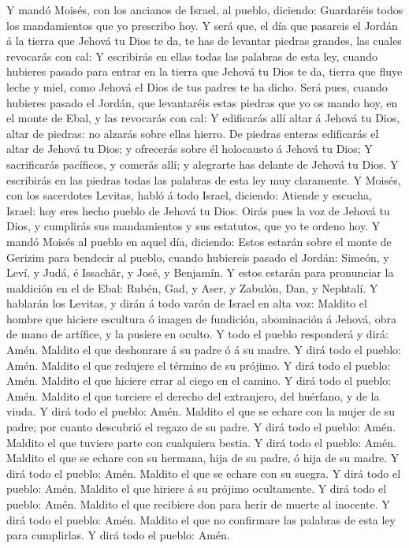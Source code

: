  Y mandó Moisés, con los ancianos de Israel, al pueblo,
diciendo: Guardaréis todos los mandamientos que yo prescribo hoy.
 Y será que, el día que pasareis el Jordán á la tierra que
Jehová tu Dios te da, te has de levantar piedras grandes, las cuales
revocarás con cal:  Y escribirás en ellas todas las
palabras de esta ley, cuando hubieres pasado para entrar en la tierra
que Jehová tu Dios te da, tierra que fluye leche y miel, como Jehová el
Dios de tus padres te ha dicho.  Será pues, cuando
hubieres pasado el Jordán, que levantaréis estas piedras que yo os mando
hoy, en el monte de Ebal, y las revocarás con cal:  Y
edificarás allí altar á Jehová tu Dios, altar de piedras: no alzarás
sobre ellas hierro.  De piedras enteras edificarás el
altar de Jehová tu Dios; y ofrecerás sobre él holocausto á Jehová tu
Dios;  Y sacrificarás pacíficos, y comerás allí; y
alegrarte has delante de Jehová tu Dios.  Y escribirás en
las piedras todas las palabras de esta ley muy claramente.
 Y Moisés, con los sacerdotes Levitas, habló á todo
Israel, diciendo: Atiende y escucha, Israel: hoy eres hecho pueblo de
Jehová tu Dios.  Oirás pues la voz de Jehová tu Dios, y
cumplirás sus mandamientos y sus estatutos, que yo te ordeno hoy.
 Y mandó Moisés al pueblo en aquel día, diciendo:
 Estos estarán sobre el monte de Gerizim para bendecir al
pueblo, cuando hubiereis pasado el Jordán: Simeón, y Leví, y Judá, é
Issachâr, y José, y Benjamín.  Y estos estarán para
pronunciar la maldición en el de Ebal: Rubén, Gad, y Aser, y Zabulón,
Dan, y Nephtalí.  Y hablarán los Levitas, y dirán á todo
varón de Israel en alta voz:  Maldito el hombre que
hiciere escultura ó imagen de fundición, abominación á Jehová, obra de
mano de artífice, y la pusiere en oculto. Y todo el pueblo responderá y
dirá: Amén.  Maldito el que deshonrare á su padre ó á su
madre. Y dirá todo el pueblo: Amén.  Maldito el que
redujere el término de su prójimo. Y dirá todo el pueblo: Amén.
 Maldito el que hiciere errar al ciego en el camino. Y
dirá todo el pueblo: Amén.  Maldito el que torciere el
derecho del extranjero, del huérfano, y de la viuda. Y dirá todo el
pueblo: Amén.  Maldito el que se echare con la mujer de
su padre; por cuanto descubrió el regazo de su padre. Y dirá todo el
pueblo: Amén.  Maldito el que tuviere parte con
cualquiera bestia. Y dirá todo el pueblo: Amén.  Maldito
el que se echare con su hermana, hija de su padre, ó hija de su madre. Y
dirá todo el pueblo: Amén.  Maldito el que se echare con
su suegra. Y dirá todo el pueblo: Amén.  Maldito el que
hiriere á su prójimo ocultamente. Y dirá todo el pueblo: Amén.
 Maldito el que recibiere don para herir de muerte al
inocente. Y dirá todo el pueblo: Amén.  Maldito el que no
confirmare las palabras de esta ley para cumplirlas. Y dirá todo el
pueblo: Amén.

